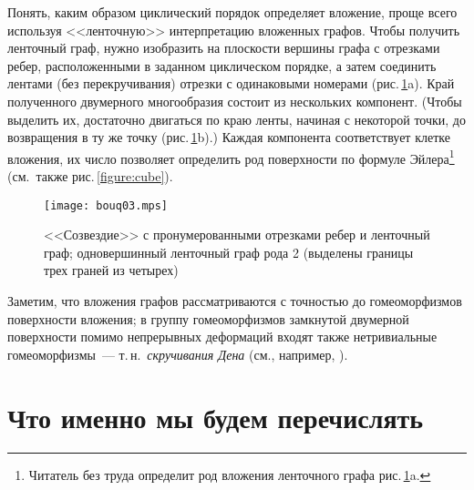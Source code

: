 \documentclass[a4paper,12pt]{article}
\def\figureref#1{рис.\,\protect\ref{#1}}
\let\picref=\figureref
\theoremstyle{plain}
\theoremstyle{definition}
\begin{document}
Понять, каким образом циклический порядок определяет вложение, проще всего используя <<ленточную>> интерпретацию вложенных
графов. Чтобы получить ленточный граф, нужно изобразить на плоскости вершины графа с отрезками ребер, расположенными в заданном
циклическом порядке, а затем соединить лентами (без перекручивания) отрезки с одинаковыми номерами
(\picref{figure:fat-graphs}a). Край полученного двумерного многообразия состоит из нескольких компонент. (Чтобы выделить их,
достаточно двигаться по краю ленты, начиная с некоторой точки, до возвращения в ту же точку (\picref{figure:fat-graphs}b).)
Каждая компонента соответствует клетке вложения, их число позволяет определить род поверхности по формуле
Эйлера\footnote{Читатель без труда определит род вложения ленточного графа \picref{figure:fat-graphs}a.} (см.~также
\picref{figure:cube}).
\begin{figure}[ht]
\centering
\texttt{[image: bouq03.mps]}
\caption{\footnotesize <<Созвездие>> с пронумерованными отрезками ребер и ленточный граф;
одновершинный ленточный граф рода 2 (выделены границы трех граней из четырех)\label{figure:fat-graphs}}
\end{figure}
Заметим, что вложения графов рассматриваются с точностью до гомеоморфизмов поверхности вложения; в группу гомеоморфизмов
замкнутой двумерной поверхности помимо непрерывных деформаций входят также нетривиальные гомеоморфизмы~---
т.\,н.~\textit{скручивания Дена} (см., например, \cite{Zvonkin2010}).


\section{Что именно мы будем перечислять}
\end{document}
